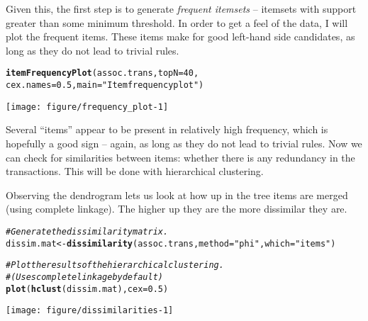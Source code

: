 \documentclass{article}\usepackage[]{graphicx}\usepackage[]{color}
\makeatletter
\def\maxwidth{ %
  \ifdim\Gin@nat@width>\linewidth
    \linewidth
  \else
    \Gin@nat@width
  \fi
}
\newcommand{\hlnum}[1]{\textcolor[rgb]{0.686,0.059,0.569}{#1}}%
\newcommand{\hlstr}[1]{\textcolor[rgb]{0.192,0.494,0.8}{#1}}%
\newcommand{\hlcom}[1]{\textcolor[rgb]{0.678,0.584,0.686}{\textit{#1}}}%
\newcommand{\hlstd}[1]{\textcolor[rgb]{0.345,0.345,0.345}{#1}}%
\newcommand{\hlkwb}[1]{\textcolor[rgb]{0.69,0.353,0.396}{#1}}%
\newcommand{\hlkwc}[1]{\textcolor[rgb]{0.333,0.667,0.333}{#1}}%
\newcommand{\hlkwd}[1]{\textcolor[rgb]{0.737,0.353,0.396}{\textbf{#1}}}%
\newenvironment{kframe}{%
 \def\at@end@of@kframe{}%
 \ifinner\ifhmode%
  \def\at@end@of@kframe{\end{minipage}}%
  \begin{minipage}{\columnwidth}%
 \fi\fi%
 \def\FrameCommand##1{\hskip\@totalleftmargin \hskip-\fboxsep
 \colorbox{shadecolor}{##1}\hskip-\fboxsep
     \hskip-\linewidth \hskip-\@totalleftmargin \hskip\columnwidth}%
 \MakeFramed {\advance\hsize-\width
   \@totalleftmargin\z@ \linewidth\hsize
   \@setminipage}}%
 {\par\unskip\endMakeFramed%
 \at@end@of@kframe}
\newenvironment{knitrout}{}{} %
\makeatother
\begin{document}
Given this, the first step is to generate \emph{frequent itemsets} -- itemsets
with support greater than some minimum threshold.  In order to get a feel of the
data, I will plot the frequent items.  These items make for good left-hand side
candidates, as long as they do not lead to trivial rules.

\begin{knitrout}
\color{fgcolor}\begin{kframe}
\begin{alltt}
\hlkwd{itemFrequencyPlot}\hlstd{(assoc.trans,} \hlkwc{topN}\hlstd{=}\hlnum{40}\hlstd{,}
                  \hlkwc{cex.names}\hlstd{=}\hlnum{0.5}\hlstd{,} \hlkwc{main}\hlstd{=}\hlstr{"Item frequency plot"}\hlstd{)}
\end{alltt}
\end{kframe}

{\centering \texttt{[image: figure/frequency\_plot-1]} 

}



\end{knitrout}

Several ``items'' appear to be present in relatively high frequency, which is
hopefully a good sign -- again, as long as they do not lead to trivial rules.
Now we can check for similarities between items: whether there is any redundancy
in the transactions.  This will be done with hierarchical clustering.

Observing the dendrogram lets us look at how up in the tree items are merged
(using complete linkage).  The higher up they are the more dissimilar they are.

\begin{knitrout}
\color{fgcolor}\begin{kframe}
\begin{alltt}
\hlcom{# Generate the dissimilarity matrix.}
\hlstd{dissim.mat} \hlkwb{<-} \hlkwd{dissimilarity}\hlstd{(assoc.trans,} \hlkwc{method}\hlstd{=}\hlstr{"phi"}\hlstd{,} \hlkwc{which}\hlstd{=}\hlstr{"items"}\hlstd{)}

\hlcom{# Plot the results of the hierarchical clustering.}
\hlcom{# (Uses complete linkage by default)}
\hlkwd{plot}\hlstd{(}\hlkwd{hclust}\hlstd{(dissim.mat),} \hlkwc{cex}\hlstd{=}\hlnum{0.5}\hlstd{)}
\end{alltt}
\end{kframe}

{\centering \texttt{[image: figure/dissimilarities-1]} 

}



\end{knitrout}
\end{document}
